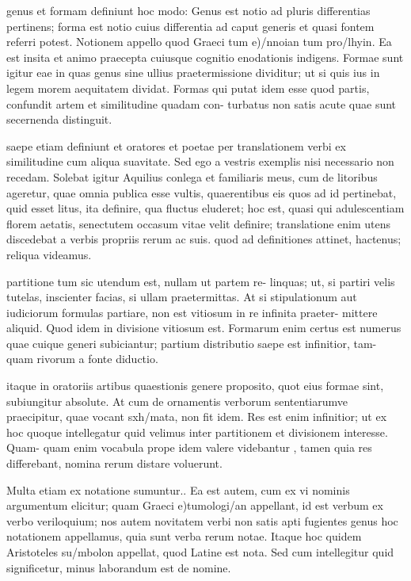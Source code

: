  genus et formam definiunt hoc modo: Genus est notio ad pluris differentias pertinens; forma est notio cuius differentia ad caput generis et quasi fontem referri potest. Notionem appello quod Graeci tum e)/nnoian tum pro/lhyin. Ea est insita et animo praecepta cuiusque cognitio enodationis indigens. Formae sunt igitur eae in quas genus sine ullius praetermissione dividitur; ut si quis ius in legem morem aequitatem dividat. Formas qui putat idem esse quod partis, confundit artem et similitudine quadam con- turbatus non satis acute quae sunt secernenda distinguit.

 saepe etiam definiunt et oratores et poetae per translationem verbi ex similitudine cum aliqua suavitate. Sed ego a vestris exemplis nisi necessario non recedam. Solebat igitur Aquilius conlega et familiaris meus, cum de litoribus ageretur, quae omnia publica esse vultis, quaerentibus eis quos ad id pertinebat, quid esset litus, ita definire, qua fluctus eluderet; hoc est, quasi qui adulescentiam florem aetatis, senectutem occasum vitae velit definire; translatione enim utens discedebat a verbis propriis rerum ac suis. quod ad definitiones attinet, hactenus; reliqua videamus.

 partitione tum sic utendum est, nullam ut partem re- linquas; ut, si partiri velis tutelas, inscienter facias, si ullam praetermittas. At si stipulationum aut iudiciorum formulas partiare, non est vitiosum in re infinita praeter- mittere aliquid. Quod idem in divisione vitiosum est. Formarum enim certus est numerus quae cuique generi subiciantur; partium distributio saepe est infinitior, tam- quam rivorum a fonte diductio.

 itaque in oratoriis artibus quaestionis genere proposito, quot eius formae sint, subiungitur absolute. At cum de ornamentis verborum sententiarumve praecipitur, quae vocant sxh/mata, non fit idem. Res est enim infinitior; ut ex hoc quoque intellegatur quid velimus inter partitionem et divisionem interesse. Quam- quam enim vocabula prope idem valere videbantur , tamen quia res differebant, nomina rerum distare voluerunt.

 Multa etiam ex notatione sumuntur.. Ea est autem, cum ex vi nominis argumentum elicitur; quam Graeci e)tumologi/an appellant, id est verbum ex verbo veriloquium; nos autem novitatem verbi non satis apti fugientes genus hoc notationem appellamus, quia sunt verba rerum notae. Itaque hoc quidem Aristoteles su/mbolon appellat, quod Latine est nota. Sed cum intellegitur quid significetur, minus laborandum est de nomine.

